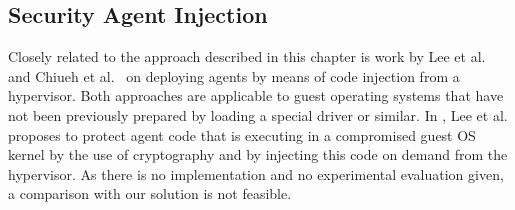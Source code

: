 
%



 
\subsection{Security Agent Injection} \label{secagent}
Closely related to the approach described in this chapter is
work by Lee et al.~\cite{lee:agent-injection} and Chiueh et al.~\cite{chiueh:sade} 
on deploying agents by means of code injection from a hypervisor. Both approaches 
are applicable to guest operating systems that have not been previously prepared by loading a 
special driver or similar.
%
In \cite{lee:agent-injection}, Lee et al. proposes to protect agent code that is 
executing in a compromised guest OS kernel by the use of cryptography and by injecting 
this code on demand from the hypervisor. As there is no implementation and no 
experimental evaluation given, a comparison with our solution is not feasible.
%
